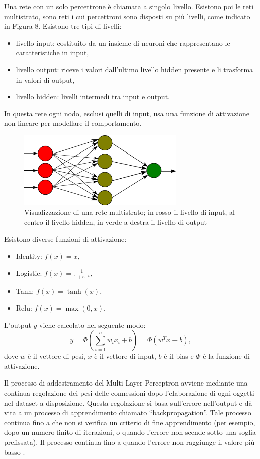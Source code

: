 \documentclass[12pt,italian]{report}
\begin{document}
Una rete con un solo percettrone è chiamata a singolo livello. Esistono poi le reti multistrato, sono reti i cui percettroni sono disposti su più livelli, come indicato in Figura 8. Esistono tre tipi di livelli: 
\begin{itemize}
	\item livello input: costituito da un insieme di neuroni che rappresentano le caratteristiche in input,
	\item livello output: riceve i valori dall'ultimo livello hidden presente e li trasforma in valori di output, 
	\item livello hidden: livelli intermedi tra input e output.
\end{itemize}


In questa rete ogni nodo, esclusi quelli di input, usa una funzione di attivazione non lineare per modellare il comportamento.

\begin{figure}[h]
	\centering
	\includegraphics[width = 80mm]{immagini/Multilayer-Perceptron}
	\caption{Visualizzazione di una rete multistrato; in rosso il livello di input, al centro il livello hidden, in verde a destra il livello di output}
\end{figure}
Esistono diverse funzioni di attivazione:
\begin{itemize}
	\item Identity: $f(x) = x$,
	\item Logistic: $f(x) = \frac{1}{1 + e^{-x}}$,
	\item Tanh: $f(x) = \tanh(x)$,
	\item Relu: $f(x) = \max(0, x)$.
\end{itemize}
L'output $y$ viene calcolato nel seguente modo: 
\begin{equation}
y = \Phi \left ( \sum_{i=1}^{n}w_ix_i + b \right ) = \Phi (w^{T}x + b),
\end{equation}
dove $w$ è il vettore di pesi, $x$ è il vettore di input, $b$ è il bias e $\Phi$ è la funzione di attivazione.

Il processo di addestramento del Multi-Layer Perceptron avviene mediante una continua regolazione dei pesi delle connessioni dopo l'elaborazione di ogni oggetti nel dataset a disposizione. Questa regolazione si basa sull'errore nell'output e dà vita a un processo di apprendimento chiamato ``backpropagation''. Tale processo continua fino a che non si verifica un criterio di fine apprendimento (per esempio, dopo un numero finito di iterazioni, o quando l'errore non scende sotto una soglia prefissata).
Il processo continua fino a quando l'errore non raggiunge il valore più basso \cite{multilayerPerceptron}.
\end{document}
